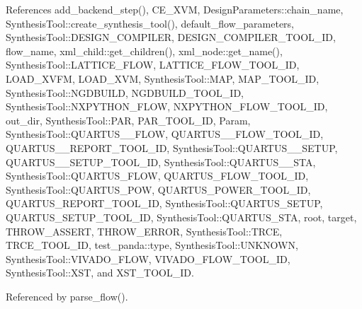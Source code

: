 References add\+\_\+backend\+\_\+step(), C\+E\+\_\+\+X\+VM, Design\+Parameters\+::chain\+\_\+name, Synthesis\+Tool\+::create\+\_\+synthesis\+\_\+tool(), default\+\_\+flow\+\_\+parameters, Synthesis\+Tool\+::\+D\+E\+S\+I\+G\+N\+\_\+\+C\+O\+M\+P\+I\+L\+ER, D\+E\+S\+I\+G\+N\+\_\+\+C\+O\+M\+P\+I\+L\+E\+R\+\_\+\+T\+O\+O\+L\+\_\+\+ID, flow\+\_\+name, xml\+\_\+child\+::get\+\_\+children(), xml\+\_\+node\+::get\+\_\+name(), Synthesis\+Tool\+::\+L\+A\+T\+T\+I\+C\+E\+\_\+\+F\+L\+OW, L\+A\+T\+T\+I\+C\+E\+\_\+\+F\+L\+O\+W\+\_\+\+T\+O\+O\+L\+\_\+\+ID, L\+O\+A\+D\+\_\+\+X\+V\+FM, L\+O\+A\+D\+\_\+\+X\+VM, Synthesis\+Tool\+::\+M\+AP, M\+A\+P\+\_\+\+T\+O\+O\+L\+\_\+\+ID, Synthesis\+Tool\+::\+N\+G\+D\+B\+U\+I\+LD, N\+G\+D\+B\+U\+I\+L\+D\+\_\+\+T\+O\+O\+L\+\_\+\+ID, Synthesis\+Tool\+::\+N\+X\+P\+Y\+T\+H\+O\+N\+\_\+\+F\+L\+OW, N\+X\+P\+Y\+T\+H\+O\+N\+\_\+\+F\+L\+O\+W\+\_\+\+T\+O\+O\+L\+\_\+\+ID, out\+\_\+dir, Synthesis\+Tool\+::\+P\+AR, P\+A\+R\+\_\+\+T\+O\+O\+L\+\_\+\+ID, Param, Synthesis\+Tool\+::\+Q\+U\+A\+R\+T\+U\+S\+\_\+\_\+\+F\+L\+OW, Q\+U\+A\+R\+T\+U\+S\+\_\+\_\+\+F\+L\+O\+W\+\_\+\+T\+O\+O\+L\+\_\+\+ID, Q\+U\+A\+R\+T\+U\+S\+\_\+\_\+\+R\+E\+P\+O\+R\+T\+\_\+\+T\+O\+O\+L\+\_\+\+ID, Synthesis\+Tool\+::\+Q\+U\+A\+R\+T\+U\+S\+\_\+\_\+\+S\+E\+T\+UP, Q\+U\+A\+R\+T\+U\+S\+\_\+\_\+\+S\+E\+T\+U\+P\+\_\+\+T\+O\+O\+L\+\_\+\+ID, Synthesis\+Tool\+::\+Q\+U\+A\+R\+T\+U\+S\+\_\+\_\+\+S\+TA, Synthesis\+Tool\+::\+Q\+U\+A\+R\+T\+U\+S\+\_\+\+F\+L\+OW, Q\+U\+A\+R\+T\+U\+S\+\_\+\+F\+L\+O\+W\+\_\+\+T\+O\+O\+L\+\_\+\+ID, Synthesis\+Tool\+::\+Q\+U\+A\+R\+T\+U\+S\+\_\+\+P\+OW, Q\+U\+A\+R\+T\+U\+S\+\_\+\+P\+O\+W\+E\+R\+\_\+\+T\+O\+O\+L\+\_\+\+ID, Q\+U\+A\+R\+T\+U\+S\+\_\+\+R\+E\+P\+O\+R\+T\+\_\+\+T\+O\+O\+L\+\_\+\+ID, Synthesis\+Tool\+::\+Q\+U\+A\+R\+T\+U\+S\+\_\+\+S\+E\+T\+UP, Q\+U\+A\+R\+T\+U\+S\+\_\+\+S\+E\+T\+U\+P\+\_\+\+T\+O\+O\+L\+\_\+\+ID, Synthesis\+Tool\+::\+Q\+U\+A\+R\+T\+U\+S\+\_\+\+S\+TA, root, target, T\+H\+R\+O\+W\+\_\+\+A\+S\+S\+E\+RT, T\+H\+R\+O\+W\+\_\+\+E\+R\+R\+OR, Synthesis\+Tool\+::\+T\+R\+CE, T\+R\+C\+E\+\_\+\+T\+O\+O\+L\+\_\+\+ID, test\+\_\+panda\+::type, Synthesis\+Tool\+::\+U\+N\+K\+N\+O\+WN, Synthesis\+Tool\+::\+V\+I\+V\+A\+D\+O\+\_\+\+F\+L\+OW, V\+I\+V\+A\+D\+O\+\_\+\+F\+L\+O\+W\+\_\+\+T\+O\+O\+L\+\_\+\+ID, Synthesis\+Tool\+::\+X\+ST, and X\+S\+T\+\_\+\+T\+O\+O\+L\+\_\+\+ID.



Referenced by parse\+\_\+flow().

